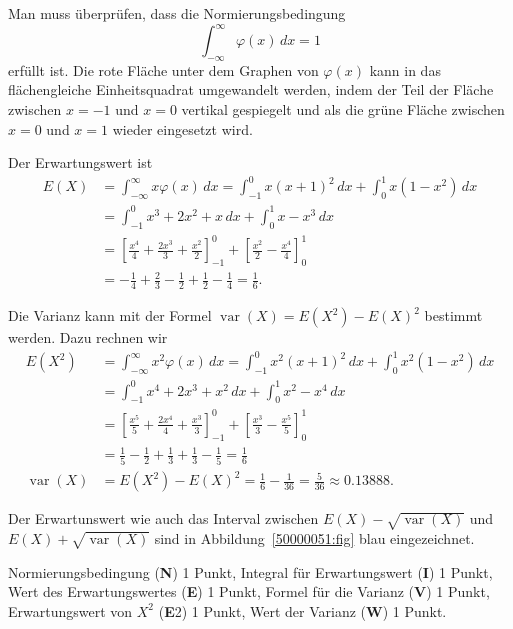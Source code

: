 \begin{loesung}
\begin{teilaufgaben}
\item
Man muss überprüfen, dass die Normierungsbedingung
\[
\int_{-\infty}^\infty \varphi(x)\, dx = 1
\]
erfüllt ist.
Die rote Fläche unter dem Graphen von $\varphi(x)$ kann in das flächengleiche
Einheitsquadrat umgewandelt werden, indem der Teil der Fläche zwischen
$x=-1$ und $x=0$ vertikal gespiegelt und als die grüne Fläche
zwischen $x=0$ und $x=1$ wieder eingesetzt wird.
\item
Der Erwartungswert ist
\begin{align*}
E(X)
&=
\int_{-\infty}^\infty x\varphi(x)\,dx
=
\int_{-1}^0 x(x+1)^2\,dx
+
\int_0^1 x(1-x^2)\,dx
\\
&=
\int_{-1}^0 x^3+2x^2+x \,dx
+
\int_0^1 x-x^3\,dx
\\
&=
\left[
\frac{x^4}{4} + \frac{2x^3}{3} + \frac{x^2}2
\right]_{-1}^0
+
\left[
\frac{x^2}{2} - \frac{x^4}{4}
\right]_0^1
\\
&=
-\frac14+\frac23-\frac12+\frac12-\frac14
=
\frac16.
\end{align*}
\item
Die Varianz kann mit der Formel $\operatorname{var}(X)=E(X^2)-E(X)^2$
bestimmt werden.
Dazu rechnen wir
\begin{align*}
E(X^2)
&=
\int_{-\infty}^\infty x^2\varphi(x)\,dx
=
\int_{-1}^0 x^2(x+1)^2\,dx
+
\int_0^1 x^2(1-x^2)\,dx
\\
&=
\int_{-1}^0 x^4+2x^3 + x^2\,dx
+
\int_0^1 x^2-x^4\,dx
\\
&=
\left[
\frac{x^5}{5} + \frac{2x^4}{4} + \frac{x^3}{3}
\right]_{-1}^0
+
\left[
\frac{x^3}{3}-\frac{x^5}{5}
\right]_0^1
\\
&=
\frac15-\frac12+\frac13+\frac13-\frac15
=\frac16
\\
\operatorname{var}(X)
&=
E(X^2) - E(X)^2
=
\frac16-\frac{1}{36}
=
\frac{5}{36}
\approx
0.13888.
\end{align*}
\end{teilaufgaben}
Der Erwartunswert wie auch das Interval zwischen
$E(X) - \sqrt{\operatorname{var}(X)}$
und
$E(X) + \sqrt{\operatorname{var}(X)}$
sind in Abbildung~\ref{50000051:fig} blau eingezeichnet.
\end{loesung}

\begin{bewertung}
Normierungsbedingung ({\bf N}) 1 Punkt,
Integral für Erwartungswert ({\bf I}) 1 Punkt,
Wert des Erwartungswertes ({\bf E}) 1 Punkt,
Formel für die Varianz ({\bf V}) 1 Punkt,
Erwartungswert von $X^2$ ({\bf E}2) 1 Punkt,
Wert der Varianz ({\bf W}) 1 Punkt.
\end{bewertung}
